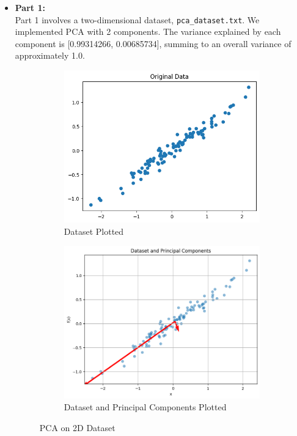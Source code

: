 \begin{itemize}
    \item \textbf{Part 1:} \\
    Part 1 involves a two-dimensional dataset, \texttt{pca\_dataset.txt}. We implemented PCA with 2 components. The variance explained by each component is [0.99314266, 0.00685734], summing to an overall variance of approximately 1.0.
    \begin{figure}[H]
    \centering
    \begin{subfigure}[b]{0.45\textwidth}
        \centering
        \includegraphics[width=\textwidth]{images/ex3task1-1-1.png}
        \caption{Dataset Plotted}
        \label{fig:Dataset Plotted}
    \end{subfigure}
    \begin{subfigure}[b]{0.45\textwidth}
        \centering
        \includegraphics[width=\textwidth]{images/ex3task1-1-2.png}
        \caption{Dataset and Principal Components Plotted}
        \label{fig:Dataset and Principal Components Plotted}
    \end{subfigure}
    \caption{PCA on 2D Dataset}
    \label{fig:part1}
\end{figure}


\end{itemize}

